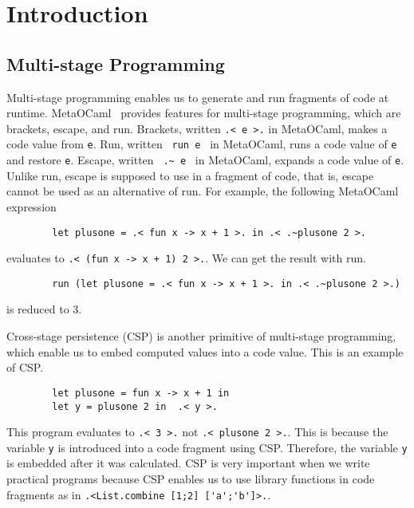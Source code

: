 
\section{Introduction}

\subsection{Multi-stage Programming}


Multi-stage programming enables us to generate and run fragments of code at runtime.  
MetaOCaml~\cite{oleg2014}  provides features for multi-stage programming, which are brackets, escape, and run.  
Brackets, written \verb|.< e >.| in MetaOCaml, makes a code value from \verb|e|.
Run, written \verb| run e | in MetaOCaml, runs a code value of \verb|e| and restore \verb|e|.
Escape, written \verb| .~ e | in MetaOCaml, expands a code value of \verb|e|.
Unlike run, escape is supposed to use in a fragment of code, that is, escape cannot be used as an alternative of run.
For example, the following MetaOCaml expression

\begin{verbatim}
        let plusone = .< fun x -> x + 1 >. in .< .~plusone 2 >.
\end{verbatim}
evaluates to \verb|.< (fun x -> x + 1) 2 >.|. We can get the result with run.
\begin{verbatim}
        run (let plusone = .< fun x -> x + 1 >. in .< .~plusone 2 >.)
\end{verbatim}
is reduced to 3.


Cross-stage persistence (CSP) is another primitive of multi-stage programming, which enable us to embed computed values into a code value.
This is an example of CSP.
\begin{verbatim}
        let plusone = fun x -> x + 1 in
        let y = plusone 2 in  .< y >.
\end{verbatim}
This program evaluates to \verb|.< 3 >.| not  \verb|.< plusone 2 >.|.
This is because the variable \verb|y| is introduced into a code fragment using CSP.
Therefore, the variable \verb|y| is embedded after it was calculated.
CSP is very important when we write practical programs 
because CSP enables us to use library functions in code fragments as in \verb|.<List.combine [1;2] ['a';'b']>.|.

